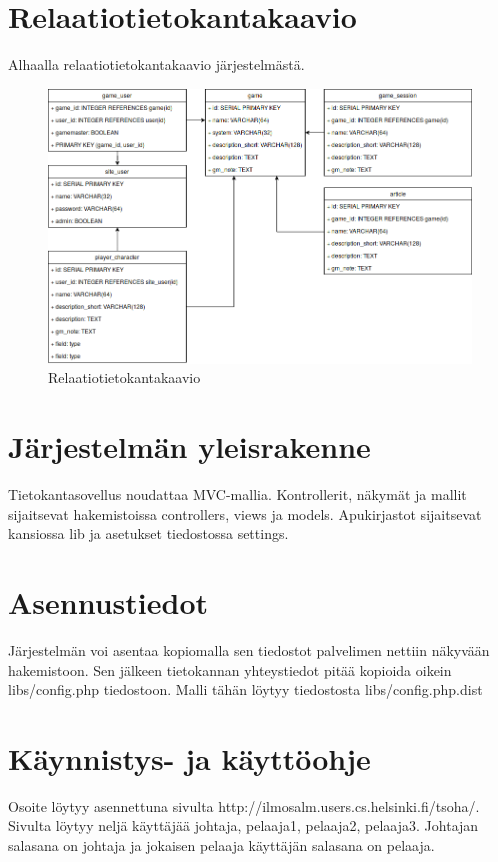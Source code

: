 \documentclass[11pt]{article}
\begin{document}
\section{Relaatiotietokantakaavio}
Alhaalla relaatiotietokantakaavio järjestelmästä.
\begin{figure}[H]
\centering
\includegraphics[scale=0.4]{pictures/relaatiokaavio.png}
\caption{Relaatiotietokantakaavio}
\end{figure}

\section{Järjestelmän yleisrakenne}
Tietokantasovellus noudattaa MVC-mallia. Kontrollerit, näkymät ja mallit sijaitsevat hakemistoissa controllers, views ja models. Apukirjastot sijaitsevat kansiossa lib ja asetukset tiedostossa settings.

\section{Asennustiedot}
Järjestelmän voi asentaa kopiomalla sen tiedostot palvelimen nettiin näkyvään hakemistoon. Sen jälkeen tietokannan yhteystiedot pitää kopioida oikein libs/config.php tiedostoon. Malli tähän löytyy tiedostosta libs/config.php.dist

\section{Käynnistys- ja käyttöohje}
Osoite löytyy asennettuna sivulta http://ilmosalm.users.cs.helsinki.fi/tsoha/. Sivulta löytyy neljä käyttäjää johtaja, pelaaja1, pelaaja2, pelaaja3. Johtajan salasana on johtaja ja jokaisen pelaaja käyttäjän salasana on pelaaja. 
\end{document}
